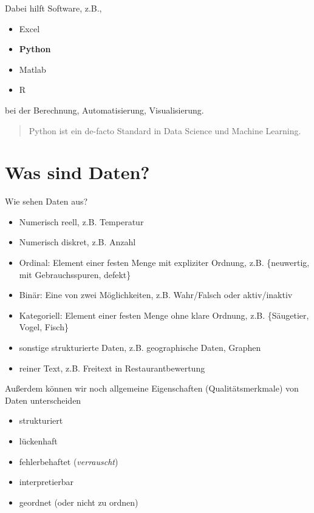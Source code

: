 \documentclass[]{book}
\providecommand{\tightlist}{%
  \setlength{\itemsep}{0pt}\setlength{\parskip}{0pt}}
\theoremstyle{definition}
\theoremstyle{definition}
\theoremstyle{definition}
\theoremstyle{definition}
\theoremstyle{remark}
\begin{document}
Dabei hilft Software, z.B.,

\begin{itemize}
\tightlist
\item
  Excel
\item
  \textbf{Python}
\item
  Matlab
\item
  R
\end{itemize}

bei der Berechnung, Automatisierung, Visualisierung.

\begin{quote}
Python ist ein de-facto Standard in Data Science und Machine Learning.
\end{quote}

\hypertarget{was-sind-daten}{%
\section{Was sind Daten?}\label{was-sind-daten}}

Wie sehen Daten aus?

\begin{itemize}
\item
  Numerisch reell, z.B. Temperatur
\item
  Numerisch diskret, z.B. Anzahl
\item
  Ordinal: Element einer festen Menge mit expliziter Ordnung, z.B.
  \{neuwertig, mit Gebrauchsspuren, defekt\}
\item
  Binär: Eine von zwei Möglichkeiten, z.B. Wahr/Falsch oder aktiv/inaktiv
\item
  Kategoriell: Element einer festen Menge ohne klare Ordnung, z.B.
  \{Säugetier, Vogel, Fisch\}
\item
  sonstige strukturierte Daten, z.B. geographische Daten, Graphen
\item
  reiner Text, z.B. Freitext in Restaurantbewertung
\end{itemize}

Außerdem können wir noch allgemeine Eigenschaften (Qualitätsmerkmale) von Daten unterscheiden

\begin{itemize}
\tightlist
\item
  strukturiert
\item
  lückenhaft
\item
  fehlerbehaftet (\emph{verrauscht})
\item
  interpretierbar
\item
  geordnet (oder nicht zu ordnen)
\end{itemize}
\end{document}
